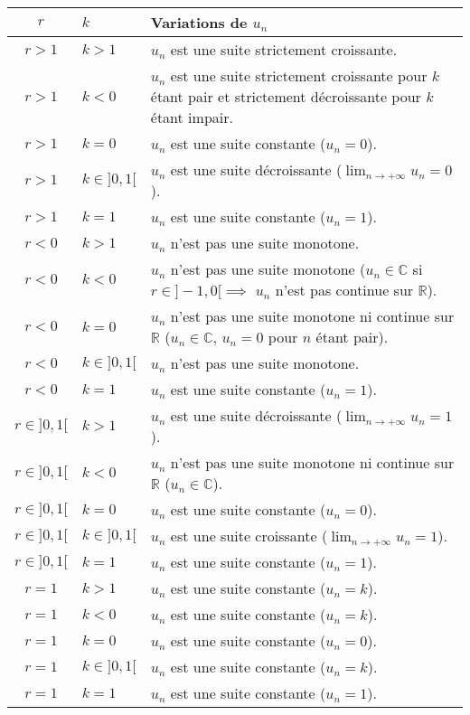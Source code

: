 \documentclass{amsart}
\theoremstyle{definition}
\theoremstyle{remark}
\numberwithin{equation}{section}
\begin{document}
\begin{tabularx}{12cm}{|c|p{1.5cm}|X|}
    \hline
    \hfil $r$ & \hfil $k$ & \hfil Variations de $u_n$ \\
    \hline
    $r>1$ & $k>1$ & $u_n$ est une suite strictement croissante. \\
    \hline
    $r>1$ & $k<0$ & $u_n$ est une suite strictement croissante pour $k$ étant pair et strictement décroissante pour $k$ étant impair. \\
    \hline
    $r>1$ & $k=0$ & $u_n$ est une suite constante ($u_n=0$). \\
    \hline
    $r>1$ & $k\in]0,1[$ & $u_n$ est une suite décroissante ($\lim_{n \to +\infty}u_n=0$). \\
    \hline
    $r>1$ & $k=1$ & $u_n$ est une suite constante ($u_n=1$). \\
    \hline
    $r<0$ & $k>1$ & $u_n$ n'est pas une suite monotone. \\
    \hline
    $r<0$ & $k<0$ & $u_n$ n'est pas une suite monotone ($u_n \in \mathbb{C}$ si $r \in ]-1,0[ \implies$ $u_n$ n'est pas continue sur $\mathbb{R}$). \\
    \hline
    $r<0$ & $k=0$ & $u_n$ n'est pas une suite monotone ni continue sur $\mathbb{R}$ ($u_n \in \mathbb{C}$, $u_n=0$ pour $n$ étant pair). \\
    \hline
    $r<0$ & $k\in]0,1[$ & $u_n$ n'est pas une suite monotone. \\
    \hline
    $r<0$ & $k=1$ & $u_n$ est une suite constante ($u_n=1$). \\
    \hline
    $r\in]0,1[$ & $k>1$ & $u_n$ est une suite décroissante ($\lim_{n \to +\infty}u_n=1$). \\
    \hline
    $r\in]0,1[$ & $k<0$ & $u_n$ n'est pas une suite monotone ni continue sur $\mathbb{R}$ ($u_n \in \mathbb{C}$). \\
    \hline
    $r\in]0,1[$ & $k=0$ & $u_n$ est une suite constante ($u_n=0$). \\
    \hline
    $r\in]0,1[$ & $k\in]0,1[$ & $u_n$ est une suite croissante ($\lim_{n \to +\infty}u_n=1$). \\
    \hline
    $r\in]0,1[$ & $k=1$ & $u_n$ est une suite constante ($u_n=1$). \\
    \hline
    $r=1$ & $k>1$ & $u_n$ est une suite constante ($u_n=k$). \\
    \hline
    $r=1$ & $k<0$ & $u_n$ est une suite constante ($u_n=k$). \\
    \hline
    $r=1$ & $k=0$ & $u_n$ est une suite constante ($u_n=0$). \\
    \hline
    $r=1$ & $k\in]0,1[$ & $u_n$ est une suite constante ($u_n=k$). \\
    \hline
    $r=1$ & $k=1$ & $u_n$ est une suite constante ($u_n=1$). \\
    \hline
\end{tabularx}
\end{document}
